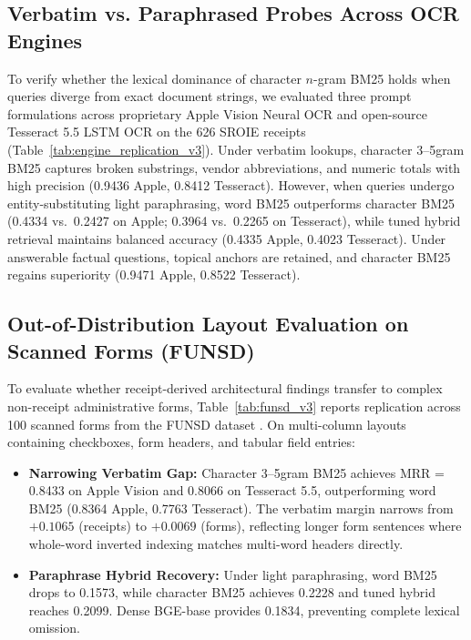 \documentclass[conference]{IEEEtran}
\begin{document}
\subsection{Verbatim vs. Paraphrased Probes Across OCR Engines}
To verify whether the lexical dominance of character $n$-gram BM25 holds when queries diverge from exact document strings, we evaluated three prompt formulations across proprietary Apple Vision Neural OCR and open-source Tesseract 5.5 LSTM OCR on the 626 SROIE receipts (Table~\ref{tab:engine_replication_v3}). Under verbatim lookups, character 3--5gram BM25 captures broken substrings, vendor abbreviations, and numeric totals with high precision (0.9436 Apple, 0.8412 Tesseract). However, when queries undergo entity-substituting light paraphrasing, word BM25 outperforms character BM25 (0.4334 vs.\ 0.2427 on Apple; 0.3964 vs.\ 0.2265 on Tesseract), while tuned hybrid retrieval maintains balanced accuracy (0.4335 Apple, 0.4023 Tesseract). Under answerable factual questions, topical anchors are retained, and character BM25 regains superiority (0.9471 Apple, 0.8522 Tesseract).

\subsection{Out-of-Distribution Layout Evaluation on Scanned Forms (FUNSD)}
To evaluate whether receipt-derived architectural findings transfer to complex non-receipt administrative forms, Table~\ref{tab:funsd_v3} reports replication across 100 scanned forms from the FUNSD dataset \cite{jaume2019funsd}. On multi-column layouts containing checkboxes, form headers, and tabular field entries:
\begin{itemize}
    \setlength{\itemsep}{0.2pt plus 0.1pt}
    \setlength{\parskip}{0pt}
    \item \textbf{Narrowing Verbatim Gap:} Character 3--5gram BM25 achieves MRR = 0.8433 on Apple Vision and 0.8066 on Tesseract 5.5, outperforming word BM25 (0.8364 Apple, 0.7763 Tesseract). The verbatim margin narrows from $+0.1065$ (receipts) to $+0.0069$ (forms), reflecting longer form sentences where whole-word inverted indexing matches multi-word headers directly.
    \item \textbf{Paraphrase Hybrid Recovery:} Under light paraphrasing, word BM25 drops to 0.1573, while character BM25 achieves 0.2228 and tuned hybrid reaches 0.2099. Dense BGE-base provides 0.1834, preventing complete lexical omission.
\end{itemize}
\end{document}
